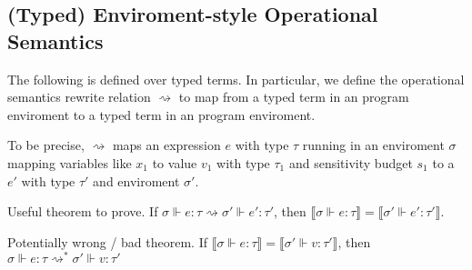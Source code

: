 \subsection{(Typed) Enviroment-style Operational Semantics}
The following is defined over typed terms. In particular, we define the
operational semantics rewrite relation $\rightsquigarrow$ to map from a typed
term in an program enviroment to a typed term in an program enviroment.

To be precise, $\rightsquigarrow$ maps an expression $e$ with type $\tau$
running in an enviroment $\sigma$ mapping variables like $x_1$ to value $v_1$
with type $\tau_1$ and sensitivity budget $s_1$ to a $e'$ with type $\tau'$ and
enviroment $\sigma'$.

Useful theorem to prove. If $\sigma \Vdash e : \tau \rightsquigarrow \sigma'
\Vdash e' : \tau'$, then $\llbracket \sigma \Vdash e : \tau \rrbracket =
\llbracket \sigma' \Vdash e' : \tau' \rrbracket$.

Potentially wrong / bad theorem. If $\llbracket \sigma \Vdash e : \tau
\rrbracket = \llbracket \sigma' \Vdash v : \tau' \rrbracket$, then $\sigma
\Vdash e : \tau \rightsquigarrow^{*} \sigma' \Vdash v : \tau'$


